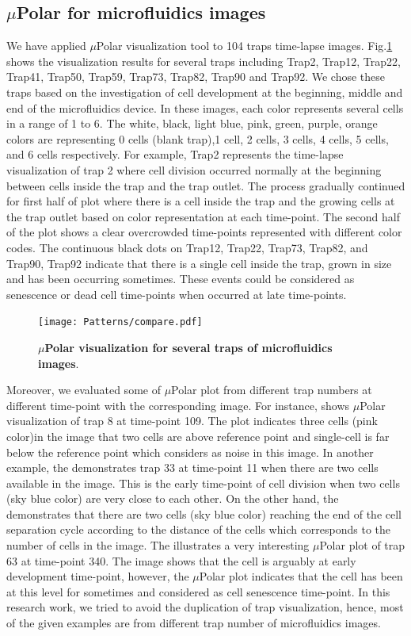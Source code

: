 \documentclass[conference]{IEEEtran}
\begin{document}
\subsection{$\mu$Polar for microfluidics images}

We have applied $\mu$Polar visualization tool to 104 traps time-lapse images. Fig.\ref{fig:compare} shows the visualization results for several traps including Trap2, Trap12, Trap22, Trap41, Trap50, Trap59, Trap73, Trap82, Trap90 and Trap92. We chose these traps based on the investigation of cell development at the beginning, middle and end of the microfluidics device. In these images, each color represents several cells in a range of 1 to 6. The white, black, light blue, pink, green, purple, orange colors are representing 0 cells (blank trap),1 cell, 2 cells, 3 cells, 4 cells, 5 cells, and 6 cells respectively. For example, Trap2 represents the time-lapse visualization of trap 2 where cell division occurred normally at the beginning between cells inside the trap and the trap outlet. The process gradually continued for first half of plot where there is a cell inside the trap and the growing cells at the trap outlet based on color representation at each time-point. The second half of the plot shows a clear overcrowded time-points represented with different color codes. The continuous black dots on Trap12, Trap22, Trap73, Trap82, and Trap90, Trap92 indicate that there is a single cell inside the trap, grown in size and has been occurring sometimes. These events could be considered as senescence or dead cell time-points when occurred at late time-points. 


\begin{figure}
\centering
\texttt{[image: Patterns/compare.pdf]}
\caption{ \textbf{ $\mu$Polar visualization for several traps of microfluidics images}.}
\label{fig:compare}
\end{figure}


Moreover, we evaluated some of $\mu$Polar plot from different trap numbers at different time-point with the corresponding image. For instance,  shows $\mu$Polar visualization of trap 8 at time-point 109. The plot indicates three cells (pink color)in the image that two cells are above reference point and single-cell is far below the reference point which considers as noise in this image. In another example, the  demonstrates trap 33 at time-point 11 when there are two cells available in the image. This is the early time-point of cell division when two cells (sky blue color) are very close to each other. On the other hand, the  demonstrates that there are two cells (sky blue color) reaching the end of the cell separation cycle according to the distance of the cells which corresponds to the number of cells in the image. The  illustrates a very interesting $\mu$Polar plot of trap 63 at time-point 340. The image shows that the cell is arguably at early development time-point, however, the $\mu$Polar plot indicates that the cell has been at this level for sometimes and considered as cell senescence time-point. In this research work, we tried to avoid the duplication of trap visualization, hence, most of the  given examples are from different trap number of microfluidics images.    
\end{document}
